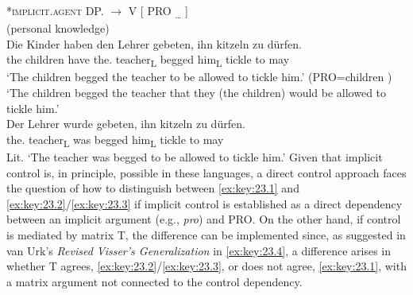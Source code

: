 \documentclass[output=paper]{langsci/langscibook}
\begin{document}
\ea\label{ex:key:23.3} *\textsc{implicit.agent}  DP.\Acc{} $\to$ \Nom{}  V  [\textsubscript{\Inf{}}  PRO \textsubscript{…}  ]\\
	\ea\label{ex:key:23.3a}  (personal knowledge)\\
		\gll Die Kinder  haben  den Lehrer  gebeten,  ihn  kitzeln  zu dürfen.\\
			the children  have  the.\Acc{} teacher\textsubscript{L}  begged  him\textsubscript{L}  tickle  to may\\
		\glt ‘The children begged the teacher to be allowed to tickle him.’ (PRO=children )\\
			‘The children begged the teacher that they (the children) would be allowed to tickle him.’
    \ex\label{ex:key:23.3b}  \parencite[171, \eqref{ex:key:23.10b}]{vanUrk2013}\\
        \gll \llap{*}Der Lehrer  wurde  gebeten,  ihn  kitzeln  zu dürfen.\\
			the.\Nom{} teacher\textsubscript{L}  was  begged  him\textsubscript{L}  tickle  to may\\
        \glt Lit. ‘The teacher was begged to be allowed to tickle him.’
	\z
\z
%
Given that implicit control is, in principle,
possible in these languages, a direct control approach faces the question of
how to distinguish between \eqref{ex:key:23.1} and
\eqref{ex:key:23.2}/\eqref{ex:key:23.3} if implicit control is established as a direct dependency between an implicit
argument (e.g., \emph{pro}) and PRO. On the other hand,
if control is mediated by matrix T, the difference can be implemented since, as
suggested in van Urk’s \emph{Revised Visser’s Generalization} in
\eqref{ex:key:23.4}, a difference arises in whether T agrees,
\eqref{ex:key:23.2}/\eqref{ex:key:23.3}, or does not agree,
\eqref{ex:key:23.1}, with a matrix argument not connected to the control
dependency.
\end{document}
